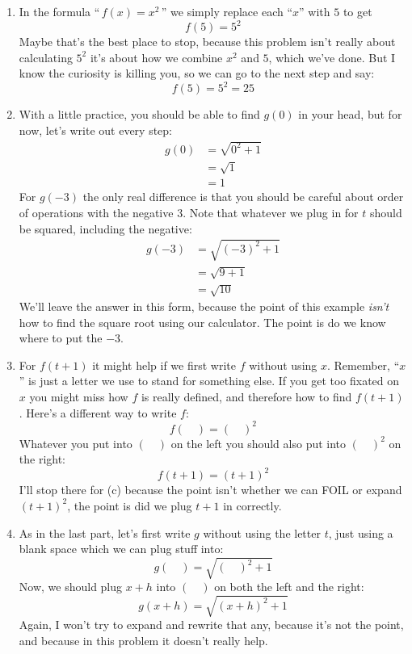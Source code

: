 \documentclass[oneside]{book}
\theoremstyle{definition}
\theoremstyle{solution}
\newtheorem*{solution}{Solution}
\newenvironment{solution}{\vspace{2in}\comment}{\endcomment}
\begin{document}
\begin{solution}
\begin{enumerate}
\item In the formula ``\,$f(x)=x^2$\,'' we simply replace each ``$x$''
  with $5$ to get
$$
f(5) = 5^2
$$
Maybe that's the best place to stop, because this problem isn't really
about calculating $5^2$ it's about how we combine $x^2$ and $5$, which
we've done.  But I know the curiosity is killing you, so we can go to
the next step and say:
$$
f(5) = 5^2 = 25
$$

\item With a little practice, you should be able to find $g(0)$ in
  your head, but for now, let's write out every step:
\begin{align*}
g(0) & = \sqrt{0^2 + 1}\\
     & = \sqrt{1}\\
     & = 1
\end{align*}
For $g(-3)$ the only real difference is that you should be careful
about order of operations with the negative $3$.  Note that whatever
we plug in for $t$ should be squared, including the negative:
\begin{align*}
g(-3) & = \sqrt{(-3)^2 + 1}\\
     & = \sqrt{9+1}\\
     & = \sqrt{10}
\end{align*}
We'll leave the answer in this form, because the point of this example
\emph{isn't} how to find the square root using our calculator.  The
point is do we know where to put the $-3$.

\item For $f(t+1)$ it might help if we first write $f$ without using
  $x$.  Remember, ``$x$'' is just a letter we use to stand for
  something else.  If you get too fixated on $x$ you might miss how
  $f$ is really defined, and therefore how to find $f(t+1)$.  Here's a
  different way to write $f$:
$$
f(\quad) = (\quad)^2
$$
Whatever you put into $(\quad)$ on the left you should also put into
$(\quad)^2$ on the right:
$$
f(t+1) = (t+1)^2
$$
I'll stop there for (c) because the point isn't whether we can FOIL or
expand $(t+1)^2$, the point is did we plug $t+1$ in correctly.

\item As in the last part, let's first write $g$ without using the
  letter $t$, just using a blank space which we can plug stuff into:
$$
g(\quad)=\sqrt{(\quad)^2+1}
$$
Now, we should plug $x+h$ into $(\quad)$ on both the left and the
right:
$$
g(x+h)=\sqrt{(x+h)^2+1}
$$
Again, I won't try to expand and rewrite that any, because it's not
the point, and because in this problem it doesn't really help.
\end{enumerate}
\end{solution}
\end{document}
